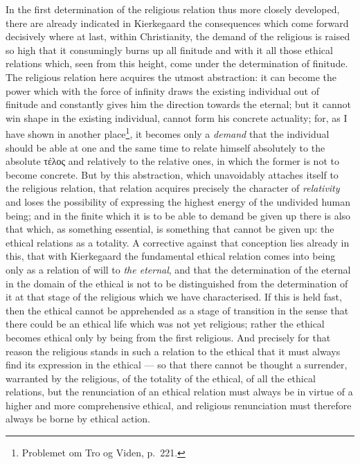 \documentclass[12pt,a4paper]{book}
\begin{document}
In the first determination of the religious relation thus more closely
developed, there are already indicated in Kierkegaard the consequences which
come forward decisively where at last, within Christianity, the demand of the
religious is raised so high that it consumingly burns up all finitude and with
it all those ethical relations which, seen from this height, come under the
determination of finitude. The religious relation here acquires the utmost
abstraction: it can become the power which with the force of infinity draws
the existing individual out of finitude and constantly gives him the direction
towards the eternal; but it cannot win shape in the existing individual,
cannot form his concrete actuality; for, as I have shown in another
place\footnote{Problemet om Tro og Viden, p.\ 221.}, it becomes only a
\emph{demand} that the individual should be able at one and the same time to
relate himself absolutely to the absolute τέλος and relatively to the relative
ones,
in which the former is not to become concrete. But by this abstraction, which
unavoidably attaches itself to the religious relation, that relation acquires
precisely the character of \emph{relativity} and loses the possibility of
expressing the highest energy of the undivided human being; and in the finite
which it is to be able to demand be given up there is also that which, as
something essential, is something that cannot be given up: the ethical
relations as a totality. A corrective against that conception lies already in
this, that with Kierkegaard the fundamental ethical relation comes into being
only as a relation of will to \emph{the eternal}, and that the determination
of the eternal in the domain of the ethical is not to be distinguished from
the determination of it at that stage of the religious which we have
characterised. If this is held fast, then the ethical cannot be apprehended as
a stage of transition in the sense that there could be an ethical life which
was not yet religious; rather the ethical becomes ethical only by being from
the first religious. And precisely for that reason the religious stands in
such a relation to the ethical that it must always find its expression in the
ethical --- so that there cannot be thought a surrender, warranted by the
religious, of the totality of the ethical, of all the ethical relations, but
the renunciation of an ethical relation must always be in virtue of a higher
and more comprehensive ethical, and religious renunciation must therefore
always be borne by ethical action.
\end{document}
